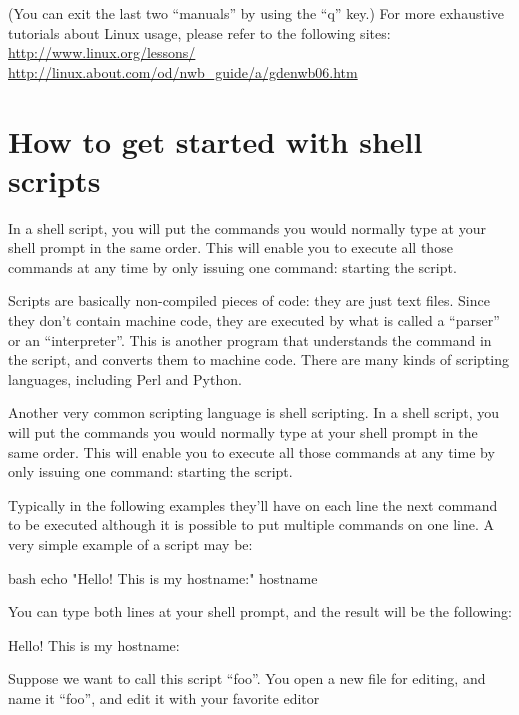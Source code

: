 \begin{prompt}
\end{prompt}

(You can exit the last two ``manuals'' by using the ``q'' key.)
For more exhaustive tutorials about Linux usage, please refer to the following sites:
\url{http://www.linux.org/lessons/}
\url{http://linux.about.com/od/nwb\_guide/a/gdenwb06.htm}

\section{How to get started with shell scripts}

In a shell script, you will put the commands you would normally type at your
shell prompt in the same order. This will enable you to execute all those
commands at any time by only issuing one command: starting the script.

Scripts are basically non-compiled pieces of code: they are just text files.
Since they don't contain machine code, they are executed by what is called a
``parser'' or an ``interpreter''. This is another program that understands the
command in the script, and converts them to machine code. There are many kinds
of scripting languages, including Perl and Python.

Another very common scripting language is shell scripting. In a shell script,
you will put the commands you would normally type at your shell prompt in the
same order. This will enable you to execute all those commands at any time by
only issuing one command: starting the script.

Typically in the following examples they'll have on each line the next command
to be executed although it is possible to put multiple commands on one line. A
very simple example of a script may be:

\begin{code}{bash}
echo "Hello! This is my hostname:"
hostname
\end{code}

You can type both lines at your shell prompt, and the result will be the following:
\begin{prompt}
Hello! This is my hostname:
\end{prompt}

Suppose we want to call this script ``foo''. You open a new file for editing, and
name it ``foo'', and edit it with your favorite editor

